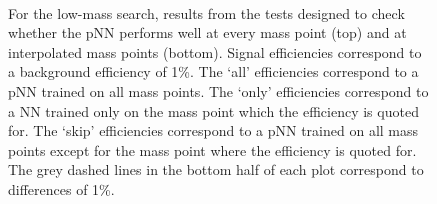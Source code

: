 \begin{figure}
    \centering
     \\
    \caption[pNN Validation Tests in the Low-Mass \XYggHtt Search]{For the low-mass \XYggHtt search, results from the tests designed to check whether the pNN performs well at every mass point (top) and at interpolated mass points (bottom). Signal efficiencies correspond to a background efficiency of 1\%. The `all' efficiencies correspond to a pNN trained on all mass points. The `only' efficiencies correspond to a NN trained only on the mass point which the efficiency is quoted for. The `skip' efficiencies correspond to a pNN trained on all mass points except for the mass point where the efficiency is quoted for. The grey dashed lines in the bottom half of each plot correspond to differences of 1\%.}\label{fig:param_tests_low_mass}
\end{figure}

